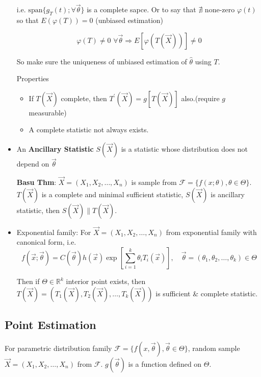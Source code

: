 \documentclass[11pt,a4paper]{ctexart}
\numberwithin{equation}{section}%
\begin{document}
\begin{itemize}
        i.e. $\mathrm{span}\{g_T(t);\forall\vec{\theta}\}$ is a complete sapce. Or to say that $\nexists$ none-zero $\varphi(t)$ so that $E(\varphi(T))=0$ (unbiased estimation)

        \[
            \varphi(T)\neq 0 \,\,\forall \vec{\theta}\Rightarrow E[\varphi(T(\vec{X}))]\neq 0  
        \]

        So make sure the uniqueness of unbiased estimation of $\hat{\theta}$ using $T$.

        Properties
        \begin{itemize}
            \item If $T(\vec{X})$ complete, then $T^\prime(\vec{X})=g[T(\vec{X})]$ also.(require $g$ measurable)

            \item A complete statistic not always exists.
        \end{itemize}
        \item  An \textbf{Ancillary Statistic} $S(\vec{X})$ is a statistic whose distribution does not depend on $\vec{\theta}$
        
        \textbf{Basu Thm}: $\vec{X}=(X_1,X_2,\ldots,X_n)$ is sample from $\mathscr{F}=\{f(x;\theta),\theta\in\Theta\}$. $T(\vec{X})$ is a complete and minimal sufficient statistic, $S(\vec{X})$ is ancillary statistic, then $S(\vec{X})\parallel T(\vec{X})$.
    \end{itemize}

    \begin{itemize}
        \item Exponential family: For $\vec{X}=(X_1,X_2,\ldots,X_n)$ from exponential family with canonical form, i.e.
    \[
        f(\vec{x};\vec{\theta})=C(\vec{\theta})h(\vec{x})\exp\left[\sum_{i=1}^k \theta_i T_i(\vec{x})\right] ,\quad \vec{\theta}=(\theta_1,\theta_2,\ldots,\theta_k)\in\Theta
    \]

    Then if $\Theta\in\mathbb{R}^k$ interior point exists, then $T(\vec{X})=(T_1(\vec{X}),T_2(\vec{X}),\ldots,T_k(\vec{X}))$ is sufficient \& complete statistic.

    
\end{itemize} 
\subsection{Point Estimation}\label{SectionPointEstimation}
    For parametric distribution family $\mathscr{F}=\{f(x,\vec{\theta}),\vec{\theta}\in\Theta\}$, random sample $\vec{X}=(X_1,X_2,\ldots,X_n)$ from $\mathscr{F}$. $g(\vec{\theta})$ is a function defined on $\Theta$. 
\end{document}
